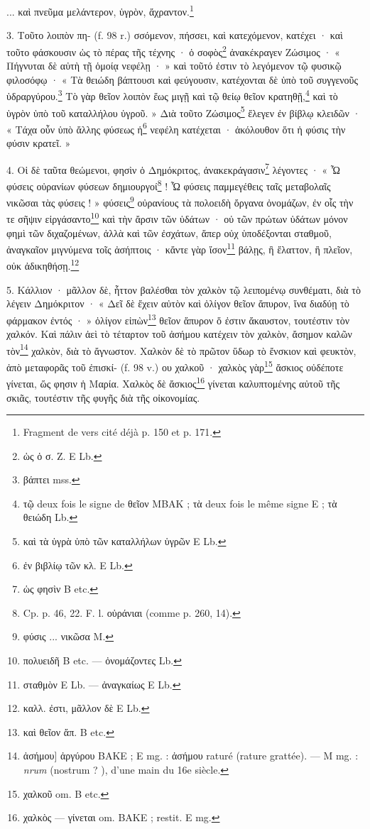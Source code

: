 \documentclass[a4paper, 11pt, oneside, polutonikogreek, french]{article}
\begin{document}
... καὶ πνεῦμα μελάντερον, ὑγρὸν, ἄχραντον.\footnote{Fragment de vers cité déjà p. 150 et p. 171.}

3. Τοῦτο λοιπὸν πη- (f. 98 r.) σσόμενον, πήσσει, καὶ κατεχόμενον, κατέχει · καὶ τοῦτο φάσκουσιν ὡς τὸ πέρας τῆς τέχνης · ὁ σοφὸς\footnote{ὡς ὁ σ. Ζ. E Lb.} ἀνακέκραγεν Ζώσιμος · « Πήγνυται δὲ αὐτὴ τῇ ὁμοίᾳ νεφέλῃ · » καὶ τοῦτό ἐστιν τὸ λεγόμενον τῷ φυσικῷ φιλοσόφῳ · « Τὰ θειώδη βάπτουσι καὶ φεύγουσιν, κατέχονται δὲ ὑπὸ τοῦ συγγενοῦς ὑδραργύρου.\footnote{βάπτει mss.} Τὸ γὰρ θεῖον λοιπὸν ἕως μιγῇ καὶ τῷ θείῳ θεῖον κρατηθῇ,\footnote{τῷ deux fois le signe de θεῖον MBAK ; τὰ deux fois le même signe E ; τὰ θειώδη Lb.} καὶ τὸ ὑγρὸν ὑπὸ τοῦ καταλλήλου ὑγροῦ. » Διὰ τοῦτο Ζώσιμος\footnote{καὶ τὰ ὑγρὰ ὑπὸ τῶν καταλλήλων ὑγρῶν E Lb.} ἔλεγεν ἐν βίβλῳ κλειδῶν · « Τάχα οὖν ὑπὸ ἄλλης φύσεως ἡ\footnote{ἐν βιβλίῳ τῶν κλ. E Lb.} νεφέλη κατέχεται · ἀκόλουθον ὅτι ἡ φύσις τὴν φύσιν κρατεῖ. »

4. Οἱ δὲ ταῦτα θεώμενοι, φησὶν ὁ Δημόκριτος, ἀνακεκράγασιν\footnote{ὡς φησὶν B etc.} λέγοντες · « Ὦ φύσεις οὐρανίων φύσεων δημιουργοί\footnote{Cp. p. 46, 22. F. l. οὐράνιαι (comme p. 260, 14).} ! Ὦ φύσεις παμμεγέθεις ταῖς μεταβολαῖς νικῶσαι τὰς φύσεις ! » φύσεις\footnote{φύσις ... νικῶσα M.} οὐρανίους τὰ πολοειδὴ ὄργανα ὀνομάζων, ἐν οἷς τὴν τε σῆψιν εἰργάσαντο\footnote{πολυειδῆ B etc. --- ὀνομάζοντες Lb.} καὶ τὴν ἄρσιν τῶν ὑδάτων · οὐ τῶν πρώτων ὑδάτων μόνον φημὶ τῶν διχαζομένων, ἀλλὰ καὶ τῶν ἐσχάτων, ἅπερ οὐχ ὑποδέξονται σταθμοῦ, ἀναγκαῖον μιγνύμενα τοῖς ἀσήπτοις · κἄντε γὰρ ἴσον\footnote{σταθμὸν E Lb. --- ἀναγκαίως E Lb.} βάλῃς, ἢ ἔλαττον, ἢ πλεῖον, οὐκ ἀδικηθήσῃ.\footnote{καλλ. ἐστι, μᾶλλον δὲ E Lb.}

5. Κάλλιον · μᾶλλον δὲ, ἧττον βαλέσθαι τὸν χαλκὸν τῷ λειπομένῳ συνθέματι, διὰ τὸ λέγειν Δημόκριτον · « Δεῖ δὲ ἔχειν αὐτὸν καὶ ὀλίγον θεῖον ἄπυρον, ἵνα διαδύῃ τὸ φάρμακον ἐντός · » ὀλίγον εἰπὼν\footnote{καὶ θεῖον ἄπ. B etc.} θεῖον ἄπυρον ὅ ἐστιν ἄκαυστον, τουτέστιν τὸν χαλκόν. Καὶ πάλιν ἀεὶ τὸ τέταρτον τοῦ ἀσήμου κατέχειν τὸν χαλκὸν, ἄσημον καλῶν τὸν\footnote{ἀσήμου] ἀργύρου BAKE ; E mg. : ἀσήμου raturé (rature grattée). --- M mg. : \emph{nrum} (nostrum ? ), d'une main du 16e siècle.} χαλκὸν, διὰ τὸ ἄγνωστον. Χαλκὸν δὲ τὸ πρῶτον ὕδωρ τὸ ἔνσκιον καὶ φευκτὸν, ἀπὸ μεταφορᾶς τοῦ ἐπισκί- (f. 98 v.) ου χαλκοῦ · χαλκὸς γὰρ\footnote{χαλκοῦ om. B etc.} ἄσκιος οὐδέποτε γίνεται, ὥς φησιν ἡ Μαρία. Χαλκὸς δὲ ἄσκιος\footnote{χαλκὸς --- γίνεται om. BAKE ; restit. E mg.} γίνεται καλυπτομένης αὐτοῦ τῆς σκιᾶς, τουτέστιν τῆς φυγῆς διὰ τῆς οἰκονομίας.
\end{document}
